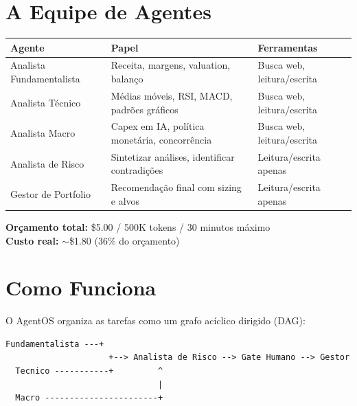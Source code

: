 \documentclass[11pt,a4paper]{article}
\newcommand{\metric}[2]{\textbf{#1:} #2}
\begin{document}
\section{A Equipe de Agentes}

\begin{table}[h]
\centering
\begin{tabularx}{\textwidth}{lXl}
\toprule
\textbf{Agente} & \textbf{Papel} & \textbf{Ferramentas} \\
\midrule
Analista Fundamentalista & Receita, margens, valuation, balan\c{c}o & Busca web, leitura/escrita \\
Analista T\'ecnico & M\'edias m\'oveis, RSI, MACD, padr\~oes gr\'aficos & Busca web, leitura/escrita \\
Analista Macro & Capex em IA, pol\'itica monet\'aria, concorr\^encia & Busca web, leitura/escrita \\
Analista de Risco & Sintetizar an\'alises, identificar contradi\c{c}\~oes & Leitura/escrita apenas \\
Gestor de Portfolio & Recomenda\c{c}\~ao final com sizing e alvos & Leitura/escrita apenas \\
\bottomrule
\end{tabularx}
\end{table}

\noindent\metric{Or\c{c}amento total}{\$5.00 / 500K tokens / 30 minutos m\'aximo}\\
\metric{Custo real}{$\sim$\$1.80 (36\% do or\c{c}amento)}


\section{Como Funciona}

O AgentOS organiza as tarefas como um grafo ac\'iclico dirigido (DAG):

\begin{center}
\begin{lstlisting}[basicstyle=\ttfamily\small, frame=single, backgroundcolor=\color{lightgray}]
  Fundamentalista ---+
                     +--> Analista de Risco --> Gate Humano --> Gestor
  Tecnico -----------+         ^
                               |
  Macro -----------------------+
\end{lstlisting}
\end{center}
\end{document}
